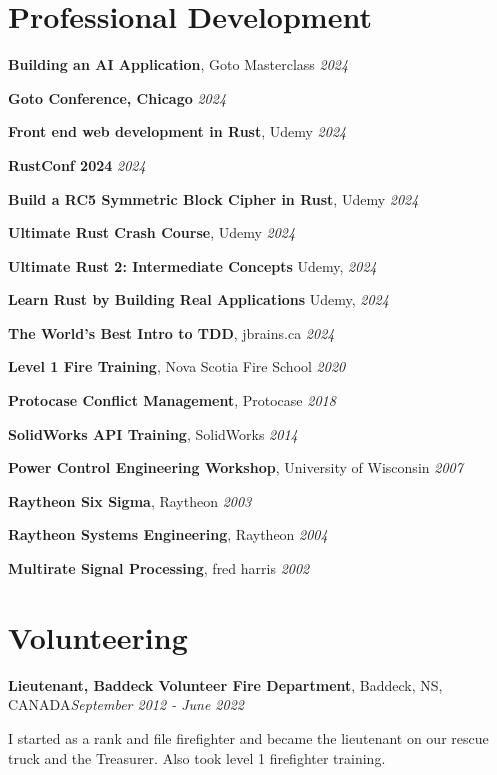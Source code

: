 \documentclass[letter,11pt]{article}
\newenvironment{noindentblock}{%
  \begin{list}{}{%
    \setlength{\leftmargin}{0in} %
    \setlength{\rightmargin}{.25in} %
    \setlength{\topsep}{0pt} %
    \setlength{\parsep}{0pt} %
  }
  \item[]}{\end{list}}
\begin{document}
\section*{Professional Development}

\noindent
\textbf{Building an AI Application}, Goto Masterclass \hfill \textit{2024}

\noindent
\textbf{Goto Conference, Chicago} \hfill \textit{2024}


\noindent
\textbf{Front end web development in Rust}, Udemy \hfill \textit{2024}

\noindent
\textbf{RustConf 2024} \hfill \textit{2024}

\noindent
\textbf{Build a RC5 Symmetric Block Cipher in Rust}, Udemy \hfill \textit{2024}

\noindent
\textbf{Ultimate Rust Crash Course}, Udemy \hfill \textit{2024}

\noindent
\textbf{Ultimate Rust 2: Intermediate Concepts} Udemy, \hfill \textit{2024}

\noindent
\textbf{Learn Rust by Building Real Applications} Udemy, \hfill \textit{2024}

\noindent
\textbf{The World's Best Intro to TDD}, jbrains.ca \hfill \textit{2024}

\noindent
\textbf{Level 1 Fire Training}, Nova Scotia Fire School \hfill \textit{2020}

\noindent
\textbf{Protocase Conflict Management}, Protocase \hfill \textit{2018}

\noindent
\textbf{SolidWorks API Training}, SolidWorks \hfill \textit{2014}

\noindent
\textbf{Power Control Engineering Workshop}, University of Wisconsin \hfill \textit{2007}

\noindent
\textbf{Raytheon Six Sigma}, Raytheon \hfill \textit{2003}

\noindent
\textbf{Raytheon Systems Engineering}, Raytheon \hfill \textit{2004}

\noindent
\textbf{Multirate Signal Processing}, fred harris \hfill \textit{2002}

\pagebreak
\section*{Volunteering}
\noindent
\textbf{Lieutenant, Baddeck Volunteer Fire Department}, Baddeck, NS, CANADA\hfill \textit{September 2012 - June 2022}
\begin{noindentblock}
  I started as a rank and file firefighter and became the lieutenant on our rescue truck and the Treasurer. Also took level 1 firefighter training.
\end{noindentblock}
\end{document}

